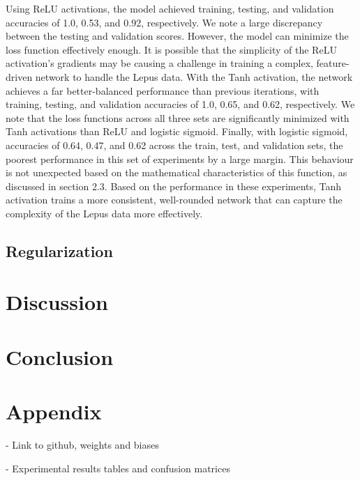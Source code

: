 \documentclass{article}
\begin{document}
Using ReLU activations, the model achieved training, testing, and validation accuracies of 1.0, 0.53, and 0.92, respectively. We note a large discrepancy between the testing and validation scores. However, the model can minimize the loss function effectively enough. It is possible that the simplicity of the ReLU activation’s gradients may be causing a challenge in training a complex, feature-driven network to handle the Lepus data. With the Tanh activation, the network achieves a far better-balanced performance than previous iterations, with training, testing, and validation accuracies of 1.0, 0.65, and 0.62, respectively. We note that the loss functions across all three sets are significantly minimized with Tanh activations than ReLU and logistic sigmoid. Finally, with logistic sigmoid, accuracies of 0.64, 0.47, and 0.62 across the train, test, and validation sets, the poorest performance in this set of experiments by a large margin. This behaviour is not unexpected based on the mathematical characteristics of this function, as discussed in section 2.3. Based on the performance in these experiments, Tanh activation trains a more consistent, well-rounded network that can capture the complexity of the Lepus data more effectively.


\subsection{Regularization}



\section{Discussion}
\section{Conclusion}







\medskip


\appendix

\section{Appendix}

- Link to github, weights and biases

- Experimental results tables and confusion matrices
\end{document}
